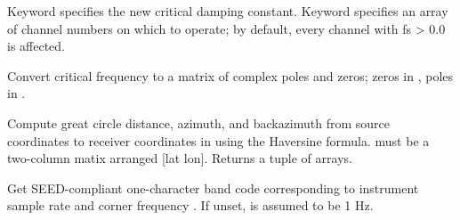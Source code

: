 \documentclass[letterpaper,11pt,english]{sphinxmanual}
\begin{document}
Keyword  specifies the new critical damping constant. Keyword  specifies an array of channel numbers on which to operate; by default, every channel with fs \textgreater{} 0.0 is affected.

\begin{fulllineitems}
\label{\detokenize{src/Appendices/function_list:fctopz}}
\end{fulllineitems}


Convert critical frequency  to a matrix of complex poles and zeros; zeros in , poles in .


\begin{fulllineitems}
\end{fulllineitems}


Compute great circle distance, azimuth, and backazimuth from source coordinates  to receiver coordinates in  using the Haversine formula.  must be a two-column matix arranged {[}lat lon{]}. Returns a tuple of arrays.

\begin{fulllineitems}
\label{\detokenize{src/Appendices/function_list:getbandcode}}
\end{fulllineitems}


Get SEED-compliant one-character band code corresponding to instrument sample rate  and corner frequency . If unset,  is assumed to be 1 Hz.

\begin{fulllineitems}
\label{\detokenize{src/Appendices/function_list:ls}}
\end{fulllineitems}
\end{document}
